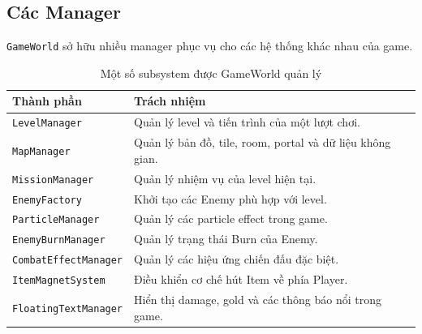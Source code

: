 \documentclass[12pt,a4paper]{report}
\begin{document}
    \subsection{Các Manager}
    \texttt{GameWorld} sở hữu nhiều manager phục vụ cho các hệ thống
    khác nhau của game.
    \begin{table}[h]
        \centering
        \begin{tabular}{|l|p{8cm}|}
            \hline
            \textbf{Thành phần} & \textbf{Trách nhiệm}                                      \\
            \hline
            \texttt{LevelManager}
            & Quản lý level và tiến trình của một lượt chơi.            \\
            \hline
            \texttt{MapManager}
            & Quản lý bản đồ, tile, room, portal và dữ liệu không gian. \\
            \hline
            \texttt{MissionManager}
            & Quản lý nhiệm vụ của level hiện tại.                      \\
            \hline
            \texttt{EnemyFactory}
            & Khởi tạo các Enemy phù hợp với level.                     \\
            \hline
            \texttt{ParticleManager}
            & Quản lý các particle effect trong game.                   \\
            \hline
            \texttt{EnemyBurnManager}
            & Quản lý trạng thái Burn của Enemy.                        \\
            \hline
            \texttt{CombatEffectManager}
            & Quản lý các hiệu ứng chiến đấu đặc biệt.                  \\
            \hline
            \texttt{ItemMagnetSystem}
            & Điều khiển cơ chế hút Item về phía Player.                \\
            \hline
            \texttt{FloatingTextManager}
            & Hiển thị damage, gold và các thông báo nổi trong game.    \\
            \hline
        \end{tabular}
        \caption{Một số subsystem được GameWorld quản lý}
        \label{tab:gameworld-managers}
    \end{table}
\end{document}
